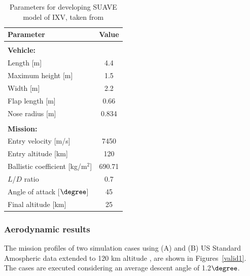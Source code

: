 \documentclass[%
 aip,
 amsmath,amssymb,
preprint,%
]{revtex4-1}
\begin{document}

\begin{table}[ht]
\caption{Parameters for developing SUAVE model of IXV, taken from \cite{pezzella_aerodynamic_2014,goncalves_hypersonic_2020}}
\label{IXV_inputs}
\begin{center}
\begin{tabular}{l c}
\textbf{Parameter} & \hspace{2em} \textbf{Value} \hspace{2em} \\ 
\hline \\
\textbf{Vehicle:} &  \\
\cline{1-1}
Length [m] & 4.4 \\
Maximum height [m] & 1.5 \\
Width [m] & 2.2 \\
Flap length [m] & 0.66  \\
Nose radius [m] & 0.834  \\ \\
\textbf{Mission:} &  \\
\cline{1-1}
Entry velocity [m/s] & 7450 \\
Entry altitude [km] & 120 \\
Ballistic coefficient [kg/m$^{2}$]  &  690.71  \\
${L}$/${D}$ ratio & 0.7 \\
Angle of attack [$\degree$] & 45 \\
Final altitude [km] & 25 \\
\end{tabular}
\end{center}
\end{table}

\subsubsection{Aerodynamic results}
The mission profiles of two simulation cases using (A) \cite{schouler_ixv_2021} and (B) US Standard Amospheric data extended to 120 km altitude \citep{united_states_committee_on_extension_to_the_standard_atmosphere_us_1976}, are shown in Figures~\ref{valid1}. The cases are executed considering an average descent angle of 1.2$\degree$.
\end{document}
